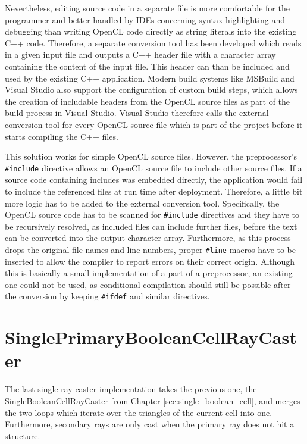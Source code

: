 Nevertheless, editing source code in a separate file is more comfortable for the programmer and better handled by IDEs concerning syntax highlighting and debugging than writing OpenCL code directly as string literals into the existing C++ code. Therefore, a separate conversion tool has been developed which reads in a given input file and outputs a C++ header file with a character array containing the content of the input file. This header can than be included and used by the existing C++ application. Modern build systems like MSBuild and Visual Studio also support the configuration of custom build steps, which allows the creation of includable headers from the OpenCL source files as part of the build process in Visual Studio. Visual Studio therefore calls the external conversion tool for every OpenCL source file which is part of the project before it starts compiling the C++ files.

This solution works for simple OpenCL source files. However, the preprocessor's \lstinline!#include! directive allows an OpenCL source file to include other source files. If a source code containing includes was embedded directly, the application would fail to include the referenced files at run time after deployment. Therefore, a little bit more logic has to be added to the external conversion tool. Specifically, the OpenCL source code has to be scanned for \lstinline!#include! directives and they have to be recursively resolved, as included files can include further files, before the text can be converted into the output character array. Furthermore, as this process drops the original file names and line numbers, proper \lstinline!#line! macros have to be inserted to allow the compiler to report errors on their correct origin. Although this is basically a small implementation of a part of a preprocessor, an existing one could not be used, as conditional compilation should still be possible after the conversion by keeping \lstinline!#ifdef! and similar directives.


\section{SinglePrimaryBooleanCellRayCaster}
\label{sec:single_primary}

The last single ray caster implementation takes the previous one, the SingleBooleanCellRayCaster from Chapter \ref{sec:single_boolean_cell}, and merges the two loops which iterate over the triangles of the current cell into one. Furthermore, secondary rays are only cast when the primary ray does not hit a structure.

